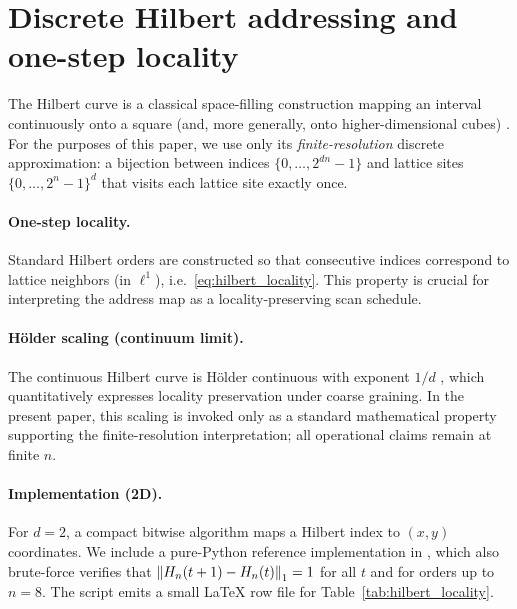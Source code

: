 
\section{Discrete Hilbert addressing and one-step locality}
\label{app:hilbert_addressing}

The Hilbert curve is a classical space-filling construction mapping an interval continuously onto a square (and, more generally, onto higher-dimensional cubes) \cite{Hilbert1891,Sagan1994}.
For the purposes of this paper, we use only its \emph{finite-resolution} discrete approximation:
a bijection between indices $\{0,\dots,2^{dn}-1\}$ and lattice sites $\{0,\dots,2^n-1\}^d$ that visits each lattice site exactly once.

\paragraph{One-step locality.}
Standard Hilbert orders are constructed so that consecutive indices correspond to lattice neighbors (in $\ell^1$), i.e.\ \eqref{eq:hilbert_locality}.
This property is crucial for interpreting the address map as a locality-preserving scan schedule.

\paragraph{H\"older scaling (continuum limit).}
The continuous Hilbert curve is H\"older continuous with exponent $1/d$ \cite{Sagan1994}, which quantitatively expresses locality preservation under coarse graining.
In the present paper, this scaling is invoked only as a standard mathematical property supporting the finite-resolution interpretation; all operational claims remain at finite $n$.

\paragraph{Implementation (2D).}
For $d=2$, a compact bitwise algorithm maps a Hilbert index to $(x,y)$ coordinates.
We include a pure-Python reference implementation in , which also brute-force verifies that $\left\lVert H_n(t+1)-H_n(t)\right\rVert_1=1$ for all $t$ and for orders up to $n=8$.
The script emits a small \LaTeX{} row file for Table~\ref{tab:hilbert_locality}.


